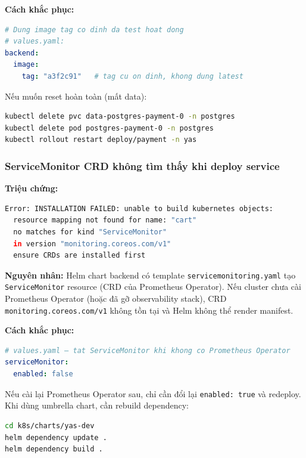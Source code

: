 \textbf{Cách khắc phục:}

\begin{lstlisting}[language=yaml]
# Dung image tag co dinh da test hoat dong
# values.yaml:
backend:
  image:
    tag: "a3f2c91"   # tag cu on dinh, khong dung latest
\end{lstlisting}

Nếu muốn reset hoàn toàn (mất data):

\begin{lstlisting}[language=bash]
kubectl delete pvc data-postgres-payment-0 -n postgres
kubectl delete pod postgres-payment-0 -n postgres
kubectl rollout restart deploy/payment -n yas
\end{lstlisting}

\subsubsection{ServiceMonitor CRD không tìm thấy khi deploy service}

\textbf{Triệu chứng:}

\begin{lstlisting}[language=bash]
Error: INSTALLATION FAILED: unable to build kubernetes objects:
  resource mapping not found for name: "cart"
  no matches for kind "ServiceMonitor"
  in version "monitoring.coreos.com/v1"
  ensure CRDs are installed first
\end{lstlisting}

\textbf{Nguyên nhân:} Helm chart backend có template \texttt{servicemonitoring.yaml} tạo \texttt{ServiceMonitor} resource (CRD của Prometheus Operator). Nếu cluster chưa cài Prometheus Operator (hoặc đã gỡ observability stack), CRD \texttt{monitoring.coreos.com/v1} không tồn tại và Helm không thể render manifest.

\textbf{Cách khắc phục:}

\begin{lstlisting}[language=yaml]
# values.yaml — tat ServiceMonitor khi khong co Prometheus Operator
serviceMonitor:
  enabled: false
\end{lstlisting}

Nếu cài lại Prometheus Operator sau, chỉ cần đổi lại \texttt{enabled: true} và redeploy. Khi dùng umbrella chart, cần rebuild dependency:

\begin{lstlisting}[language=bash]
cd k8s/charts/yas-dev
helm dependency update .
helm dependency build .
\end{lstlisting}

